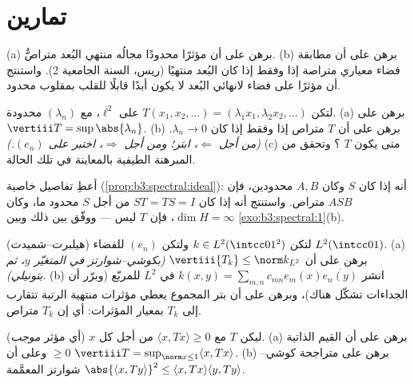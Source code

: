 \section{تمارين}

\begin{exercise}[$\star$]\label{exo:b3:spectral:1}
(a) برهن على أن مؤثرًا محدودًا مجالُه منتهي البُعد متراصٌّ.
(b) برهن على أن مطابقة فضاء معياري متراصة إذا وفقط إذا كان
البُعد منتهيًا (ريس، السنة الجامعية 2). واستنتج أن مؤثرًا
 على فضاء لانهائي البُعد لا يكون أبدًا قابلًا للقلب
بمقلوب محدود.
\end{exercise}

\begin{exercise}[$\star$]\label{exo:b3:spectral:2}
لتكن $T(x_1, x_2, \dots) = (\lambda_1x_1, \lambda_2x_2, \dots)$ على $\ell^2$، مع $(\lambda_n)$ محدودة.
(a) برهن على $\vertiii T = \sup\abs{\lambda_n}$.
(b) برهن على أن $T$ متراص إذا وفقط إذا كان $\lambda_n \to 0$.
\emph{(من أجل $\Leftarrow$، ابتر؛ ومن أجل $\Rightarrow$، اختبر
على $(e_n)$.)}
(c) متى يكون $T$ ؟ وتحقق من المبرهنة الطيفية
بالمعاينة في تلك الحالة.
\end{exercise}

\begin{exercise}[$\star\star$]\label{exo:b3:spectral:3}
أعطِ تفاصيل خاصية  (\cref{prop:b3:spectral:ideal}): أنه إذا كان $S$
 وكان $A, B$ محدودين، فإن $ASB$ متراص. واستنتج أنه إذا
كان $ST = TS = I$ من أجل $S$ محدود ما، وكان $\dim H = \infty$، فإن $T$
ليس  --- ووفّق بين ذلك وبين \cref{exo:b3:spectral:1}(b).
\end{exercise}

\begin{exercise}[$\star\star$]\label{exo:b3:spectral:4}
(هيلبرت--شميدت) لتكن $k \in L^2(\intcc01^2)$ ولتكن $(e_n)$ 
للفضاء $L^2(\intcc01)$.
(a) برهن على أن $\vertiii{T_k} \leq \norm k_{L^2}$ \emph{(بكوشي--شوارتز في المتغيّر $y$،
ثم بتونيلي)}.
(b) انشر $k(x,y) = \sum_{m,n}c_{mn}e_m(x)\overline{e_n(y)}$ في $L^2$ للمربّع (وبرّر أن الجداءات تشكّل
 هناك)، وبرهن على أن بتر المجموع يعطي مؤثرات
منتهية الرتبة تتقارب إلى $T_k$ بمعيار المؤثرات: أي إن $T_k$
متراص.
\end{exercise}

\begin{exercise}[$\star\star$]\label{exo:b3:spectral:5}
ليكن $T$  مع $\langle x, Tx\rangle \geq 0$ من أجل كل $x$ (أي مؤثر
\emph{موجب}).
(a) برهن على أن القيم الذاتية $\geq 0$ وعلى أن $\vertiii T =
\sup_{\norm x\leq1}\langle x, Tx\rangle$.
(b) برهن على متراجحة كوشي--شوارتز المعمَّمة $\abs{\langle x, Ty\rangle}^2 \leq \langle x, Tx\rangle\langle
y, Ty\rangle$.
\end{exercise}

